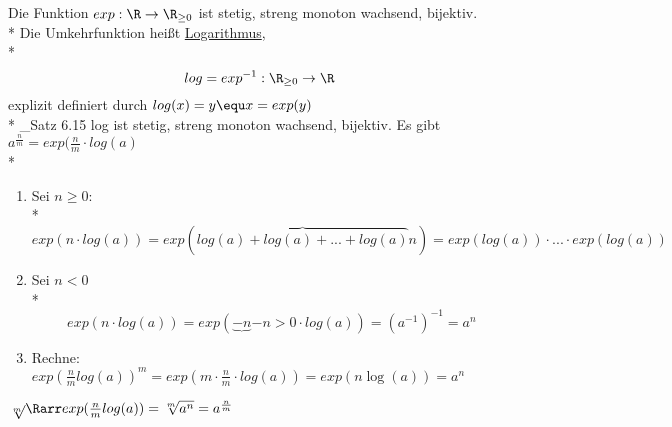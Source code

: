 Die Funktion $exp: \R \to \R_{\geq 0}$ ist stetig, streng monoton wachsend, bijektiv.\\*
Die Umkehrfunktion heißt \ul{Logarithmus},\\*
$$log = exp^{-1}: \R_{\geq 0} \to \R$$
explizit definiert durch $log(x) = y \equ x = exp(y)$\\*
\Rarr_{Satz 6.15} log ist stetig, streng monoton wachsend, bijektiv.
%
%
Es gibt $a^{\frac{n}{m}} =  exp(\frac{n}{m} \cdot log(a)$\\*
\bew
	\begin{enumerate}
	\item{Sei $n \geq 0$:\\*
	$$exp(n \cdot log(a)) = exp(\overbrace{log(a) + log(a) + ... + log(a)}{n}) = exp(log(a)) \cdot ... \cdot exp(log(a))$$}
	\item{Sei $n < 0$\\*
	 $$exp(n \cdot log(a)) = exp(\underbrace{-n}{-n > 0} \cdot log (a)) = (a^{-1})^{-1} = a^n$$}
	 \item{Rechne: $exp(\frac{n}{m} log(a))^m = exp(m \cdot \frac{n}{m} \cdot log(a)) = exp(n \log(a)) = a^n$}
	\end{enumerate}	 
	$\sqrt[m]{} \Rarr exp(\frac{n}{m} log(a)) = \sqrt[m]{a^n} = a^\frac{n}{m}$
	

